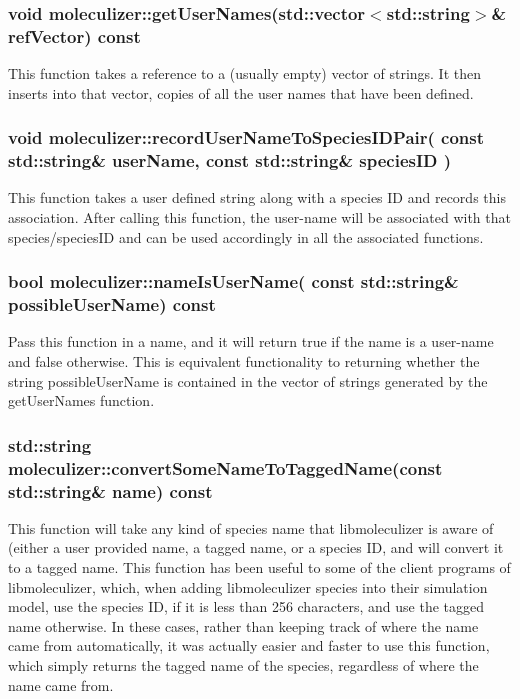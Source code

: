 \subsubsection{void moleculizer::getUserNames(std::vector$<$std::string$>$\& refVector) const}

This function takes a reference to a (usually empty) vector of
strings.  It then inserts into that vector, copies of all the user
names that have been defined.  


\subsubsection{void moleculizer::recordUserNameToSpeciesIDPair( const std::string\& userName,
const std::string\& speciesID )}
This function takes a user defined string along with a species ID and
records this association.  After calling this function, the user-name
will be associated with that species/speciesID and can be used
accordingly in all the associated functions.

\subsubsection{bool moleculizer::nameIsUserName( const std::string\&
  possibleUserName) const }

Pass this function in a name, and it will return true if the name is a
user-name and false otherwise.  This is equivalent functionality to
returning whether the string possibleUserName is contained in the
vector of strings generated by the getUserNames function.

\subsubsection{std::string moleculizer::convertSomeNameToTaggedName(const
  std::string\& name) const}
This function will take any kind of species name that libmoleculizer
is aware of (either a user provided name, a tagged name, or a species
ID, and will convert it to a tagged name.  This function has been
useful to some of the client programs of libmoleculizer, which, when
adding libmoleculizer species into their simulation model, use the
species ID, if it is less than 256 characters, and use the tagged name
otherwise.  In these cases, rather than keeping track of where the
name came from automatically, it was actually easier and faster to use
this function, which simply returns the tagged name of the species,
regardless of where the name came from.

